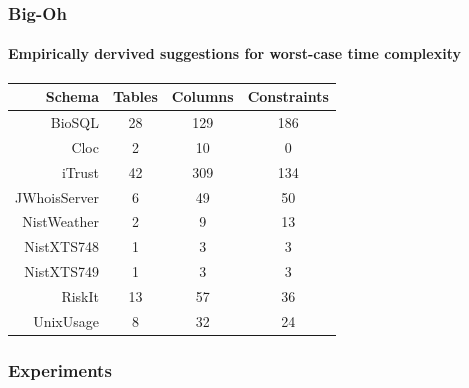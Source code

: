 \begin{frame}
  \frametitle{Big-Oh}
  \framesubtitle{Empirically dervived suggestions for worst-case time
    complexity}

  \begin{center}

  {\normalsize
  \begin{tabular}{r | c c c}
                           Schema & Tables & Columns & Constraints \\ \hline
    BioSQL                        & 28     & 129     & 186 \\
    Cloc                          & 2      & 10      & 0 \\
    iTrust                        & 42     & 309     & 134 \\
    JWhoisServer                  & 6      & 49      & 50 \\
    NistWeather                   & 2      & 9       & 13 \\
    NistXTS748                    & 1      & 3       & 3 \\
    NistXTS749                    & 1      & 3       & 3 \\
    RiskIt                        & 13     & 57      & 36 \\
    UnixUsage                     & 8      & 32      & 24
\end{tabular}}

\end{center}

\end{frame}

\begin{frame}
\frametitle{Experiments}
\centering


\end{frame}

